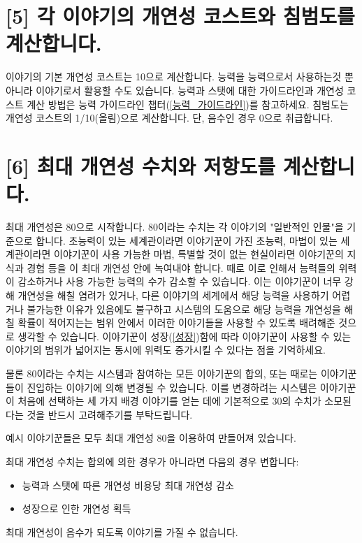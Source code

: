 \documentclass[12pt]{report}
\begin{document}
	\section*{[5] 각 이야기의 개연성 코스트와 침범도를 계산합니다.}
	
	이야기의 기본 개연성 코스트는 10으로 계산합니다.
	능력을 능력으로서 사용하는것 뿐 아니라 이야기로서 활용할 수도 있습니다.
	능력과 스탯에 대한 가이드라인과 개연성 코스트 계산 방법은 능력 가이드라인 챕터(\ref{능력_가이드라인})를 참고하세요. 침범도는 개연성 코스트의 1/10(올림)으로 계산합니다. 단, 음수인 경우 0으로 취급합니다.
	
	\section*{[6] 최대 개연성 수치와 저항도를 계산합니다.}
	최대 개연성은 80으로 시작합니다. 80이라는 수치는 각 이야기의 "일반적인 인물"을 기준으로 합니다. 초능력이 있는 세계관이라면 이야기꾼이 가진 초능력, 마법이 있는 세계관이라면 이야기꾼이 사용 가능한 마법, 특별할 것이 없는 현실이라면 이야기꾼의 지식과 경험 등을 이 최대 개연성 안에 녹여내야 합니다. 때로 이로 인해서 능력들의 위력이 감소하거나 사용 가능한 능력의 수가 감소할 수 있습니다. 이는 이야기꾼이 너무 강해 개연성을 해칠 염려가 있거나, 다른 이야기의 세계에서 해당 능력을 사용하기 어렵거나 불가능한 이유가 있음에도 불구하고 시스템의 도움으로 해당 능력을 개연성을 해칠 확률이 적어지는는 범위 안에서 이러한 이야기들을 사용할 수 있도록 배려해준 것으로 생각할 수 있습니다. 이야기꾼이 성장(\ref{성장})함에 따라 이야기꾼이 사용할 수 있는 이야기의 범위가 넓어지는 동시에 위력도 증가시킬 수 있다는 점을 기억하세요.
	
	물론 80이라는 수치는 시스템과 참여하는 모든 이야기꾼의 합의, 또는 때로는 이야기꾼들이 진입하는 이야기에 의해 변경될 수 있습니다. 이를 변경하려는 시스템은 이야기꾼이 처음에 선택하는 세 가지 배경 이야기를 얻는 데에 기본적으로 30의 수치가 소모된다는 것을 반드시 고려해주기를 부탁드립니다.
	
	예시 이야기꾼들은 모두 최대 개연성 80을 이용하여 만들어져 있습니다.
	
	최대 개연성 수치는 합의에 의한 경우가 아니라면 다음의 경우 변합니다:
	\begin{itemize}
		\item 능력과 스탯에 따른 개연성 비용당 최대 개연성 감소
		\item 성장으로 인한 개연성 획득
	\end{itemize}
	최대 개연성이 음수가 되도록 이야기를 가질 수 없습니다.
	
\end{document}
